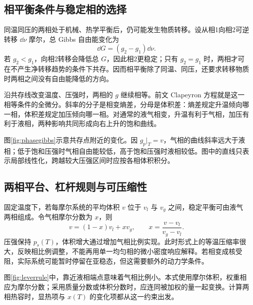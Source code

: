 \subsection{相平衡条件与稳定相的选择}
\label{th:phasestability}
同温同压的两相处于机械、热学平衡后，仍可能发生物质转移。设从相1向相2可逆转移 $\dd\nu$ 摩尔，总 Gibbs 自由能变化为
\[
 \dd G=(g_2-g_1)\dd\nu.
\]
若 $g_2<g_1$，向相2转移会降低总 $G$，因此相2更稳定；只有 $g_2=g_1$ 时，两相才可在不产生净转移趋势的条件下共存。因而相平衡除了同温、同压，还要求转移物质时两相之间没有自由能降低的方向。

沿共存线改变温度、压强时，两相的 $g$ 继续相等。前文 Clapeyron 方程就是这一相等条件的全微分。斜率的分子是相变熵差，分母是体积差：熵差规定升温倾向哪一相，体积差规定加压倾向哪一相。对通常的液气相变，升温有利于气相，加压有利于液相，两种影响共同形成向右上升的饱和曲线。

图\ref{fig:phasegibbs}示意共存点附近的变化。因 $g_p|_T=v$，气相的曲线斜率远大于液相；低于饱和压强时气相自由能较低，高于饱和压强时液相较低。图中的直线只表示局部线性化，跨越较大压强区间时应按各相体积积分。

\subsection{两相平台、杠杆规则与可压缩性}
固定温度下，若每摩尔系统的平均体积 $v$ 位于 $v_l$ 与 $v_g$ 之间，稳定平衡可由液气两相组成。令气相摩尔分数为 $x$，则
\[
 v=(1-x)v_l+xv_g,\qquad
 x=\frac{v-v_l}{v_g-v_l}.
\]
压强保持 $p_s(T)$，体积增大通过增加气相比例实现。此时形式上的等温压缩率很大，反映相比例调整，不能再用单一均匀相的微小密度响应解释。若相变成核受阻，实际系统可能暂时停留在亚稳态，但这需要额外的动力学条件。

图\ref{fig:leverrule}中，靠近液相端点意味着气相比例小。本式使用摩尔体积，权重相应为摩尔分数；采用质量分数或体积分数时，应连同被加权的量一起变换。计算两相热容时，显热项与 $x(T)$ 的变化项都从这一约束出发。

